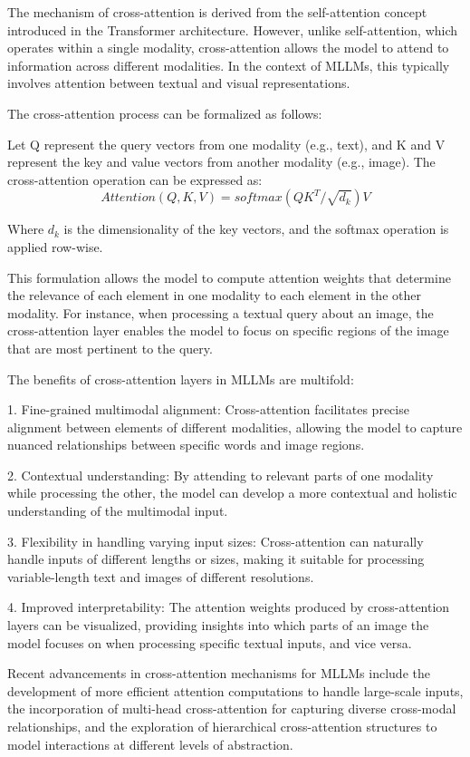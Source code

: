 The mechanism of cross-attention is derived from the self-attention concept introduced in the Transformer architecture. However, unlike self-attention, which operates within a single modality, cross-attention allows the model to attend to information across different modalities. In the context of MLLMs, this typically involves attention between textual and visual representations.

The cross-attention process can be formalized as follows:

Let Q represent the query vectors from one modality (e.g., text), and K and V represent the key and value vectors from another modality (e.g., image). The cross-attention operation can be expressed as:
\begin{equation}
    Attention(Q, K, V) = softmax(Q{K^T} / \sqrt{d_k})V
\end{equation}

Where $d_k$ is the dimensionality of the key vectors, and the softmax operation is applied row-wise.

This formulation allows the model to compute attention weights that determine the relevance of each element in one modality to each element in the other modality. For instance, when processing a textual query about an image, the cross-attention layer enables the model to focus on specific regions of the image that are most pertinent to the query.

The benefits of cross-attention layers in MLLMs are multifold:

1. Fine-grained multimodal alignment: Cross-attention facilitates precise alignment between elements of different modalities, allowing the model to capture nuanced relationships between specific words and image regions.

2. Contextual understanding: By attending to relevant parts of one modality while processing the other, the model can develop a more contextual and holistic understanding of the multimodal input.

3. Flexibility in handling varying input sizes: Cross-attention can naturally handle inputs of different lengths or sizes, making it suitable for processing variable-length text and images of different resolutions.

4. Improved interpretability: The attention weights produced by cross-attention layers can be visualized, providing insights into which parts of an image the model focuses on when processing specific textual inputs, and vice versa.

Recent advancements in cross-attention mechanisms for MLLMs include the development of more efficient attention computations to handle large-scale inputs, the incorporation of multi-head cross-attention for capturing diverse cross-modal relationships, and the exploration of hierarchical cross-attention structures to model interactions at different levels of abstraction.

